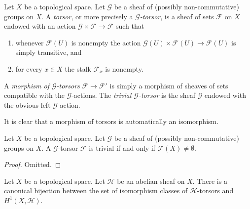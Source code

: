 \begin{definition}
\label{definition-torsor}
Let $X$ be a topological space.
Let $\mathcal{G}$ be a sheaf of (possibly non-commutative) groups on $X$.
A {\it torsor}, or more precisely a {\it $\mathcal{G}$-torsor}, is a sheaf
of sets $\mathcal{F}$ on $X$ endowed with an action
$\mathcal{G} \times \mathcal{F} \to \mathcal{F}$ such that
\begin{enumerate}
\item whenever $\mathcal{F}(U)$ is nonempty the action
$\mathcal{G}(U) \times \mathcal{F}(U) \to \mathcal{F}(U)$
is simply transitive, and
\item for every $x \in X$ the stalk $\mathcal{F}_x$ is nonempty.
\end{enumerate}
A {\it morphism of $\mathcal{G}$-torsors} $\mathcal{F} \to \mathcal{F}'$
is simply a morphism of sheaves of sets compatible with the
$\mathcal{G}$-actions. The {\it trivial $\mathcal{G}$-torsor}
is the sheaf $\mathcal{G}$ endowed with the obvious left
$\mathcal{G}$-action.
\end{definition}

\noindent
It is clear that a morphism of torsors is automatically an isomorphism.

\begin{lemma}
\label{lemma-trivial-torsor}
Let $X$ be a topological space.
Let $\mathcal{G}$ be a sheaf of (possibly non-commutative) groups on $X$.
A $\mathcal{G}$-torsor $\mathcal{F}$ is trivial if and only if
$\mathcal{F}(X) \not = \emptyset$.
\end{lemma}

\begin{proof}
Omitted.
\end{proof}

\begin{lemma}
\label{lemma-torsors-h1}
Let $X$ be a topological space.
Let $\mathcal{H}$ be an abelian sheaf on $X$.
There is a canonical bijection between the set of isomorphism
classes of $\mathcal{H}$-torsors and $H^1(X, \mathcal{H})$.
\end{lemma}

